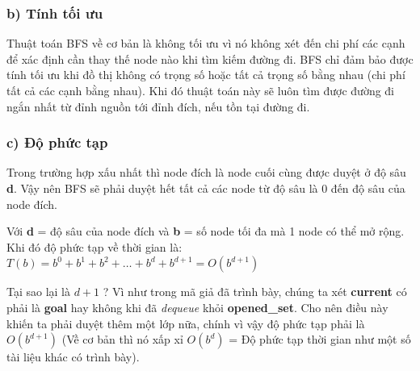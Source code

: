 \subsubsection{b) Tính tối ưu}
\hspace{0.42cm}Thuật toán BFS về cơ bản là không tối ưu vì nó không xét đến chi phí các cạnh để xác định cần thay thế node nào khi tìm kiếm đường đi. BFS chỉ đảm bảo được tính tối ưu khi đồ thị không có trọng số hoặc tất cả trọng số bằng nhau (chi phí tất cả các cạnh bằng nhau). Khi đó thuật toán này sẽ luôn tìm được đường đi ngắn nhất từ đỉnh nguồn tới đỉnh đích, nếu tồn tại đường đi.

\subsubsection{c) Độ phức tạp}
\hspace{0.42cm}Trong trường hợp xấu nhất thì node đích là node cuối cùng được duyệt ở độ sâu \textbf{d}. Vậy nên  BFS sẽ phải duyệt hết tất cả các node từ độ sâu là 0 đến độ sâu của node đích.

\hspace{0.42cm}Với \textbf{d} = độ sâu của node đích và \textbf{b} = số node tối đa mà 1 node có thể mở rộng. Khi đó độ phức tạp về thời gian là: $T(b) = b^0 + b^1 + b^2 + … + b^d + b^{d+1}= O(b^{d+1})$

\hspace{0.42cm}Tại sao lại là $d+1$ ? Vì như trong mã giả đã trình bày, chúng ta xét \textbf{current} có phải là \textbf{goal} hay không khi đã \textit{dequeue} khỏi \textbf{opened\_set}. Cho nên điều này khiến ta phải duyệt thêm một lớp nữa, chính vì vậy độ phức tạp phải là $O(b^{d+1})$ (Về cơ bản thì nó xấp xỉ $O(b^d)$ = Độ phức tạp thời gian như một số tài liệu khác có trình bày).
